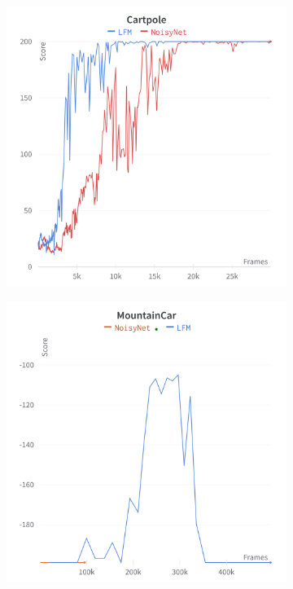 \documentclass[]{uai2021} %
\begin{document}
\begin{figure}
    \centering
    \begin{subfigure}[b]{0.45\columnwidth}
        \centering
        \includegraphics[width=\columnwidth]{charts/Cartpole_score}
    \end{subfigure}
    \begin{subfigure}[b]{0.45\columnwidth}
        \centering
        \includegraphics[width=\columnwidth]{charts/MountainCar_score}

\end{subfigure}
\end{figure}
\end{document}
